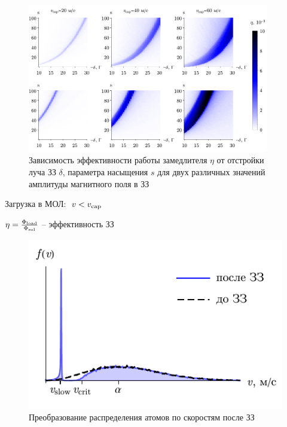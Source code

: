 



\begin{minipage}{0.65\textwidth}
\begin{figure}[ht]
    \centering
    \hspace{1 mm} 
    \includegraphics[width=0.94\textwidth]{../MOT/figs/etas_v4.pdf}
    \caption{Зависимость эффективности работы замедлителя $\eta$ от отстройки луча ЗЗ $\delta$, параметра насыщения $s$ для двух различных значений амплитуды магнитного поля в ЗЗ}
\end{figure}

\end{minipage}
\hfill
\begin{minipage}{0.31\textwidth}



Загрузка в МОЛ: $\ v < v_{\textnormal{cap}}$

\phantom{42}

$\eta = \frac{\Phi_{\textnormal{load}}}{\Phi_{\textnormal{sol}}}$ -- эффективность ЗЗ

\phantom{42}

\begin{figure}[h]
    \centering
    \includegraphics[scale=0.66]{../MOT/figs/vdist_v5.pdf}
    \caption{Преобразование распределения атомов по скоростям после ЗЗ}
\end{figure}


\end{minipage}